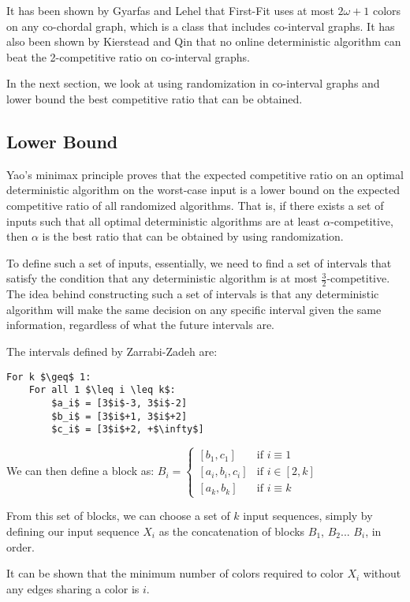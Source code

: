 It has been shown by Gyarfas and Lehel that First-Fit uses at most $2\omega+1$ colors on any co-chordal graph, which is a class that includes co-interval graphs. It has also been shown by Kierstead and Qin that no online deterministic algorithm can beat the 2-competitive ratio on co-interval graphs.

In the next section, we look at using randomization in co-interval graphs and lower bound the best competitive ratio that can be obtained.
\subsection{Lower Bound}
Yao's minimax principle proves that the expected competitive ratio on an optimal deterministic algorithm on the worst-case input is a lower bound on the expected competitive ratio of all randomized algorithms. That is, if there exists a set of inputs such that all optimal deterministic algorithms are at least $\alpha$-competitive, then $\alpha$ is the best ratio that can be obtained by using randomization.

To define such a set of inputs, essentially, we need to find a set of intervals that satisfy the condition that any deterministic algorithm is at most $\frac{3}{2}$-competitive. The idea behind constructing such a set of intervals is that any deterministic algorithm will make the same decision on any specific interval given the same information, regardless of what the future intervals are.

The intervals defined by Zarrabi-Zadeh are: 
\begin{Verbatim}[commandchars=\\\{\},codes={\catcode`$=3\catcode`_=8}]
For k $\geq$ 1:
    For all 1 $\leq i \leq k$:
        $a_i$ = [3$i$-3, 3$i$-2]
        $b_i$ = [3$i$+1, 3$i$+2]
        $c_i$ = [3$i$+2, +$\infty$]
\end{Verbatim}
We can then define a block as:
$B_i = \begin{cases} [b_1, c_1] &\mbox{if } i \equiv 1 \\
[a_i, b_i, c_i] & \mbox{if } i \in [2,k] \\
 [a_k, b_k] &\mbox{if } i \equiv k \end{cases}$ 

From this set of blocks, we can choose a set of $k$ input sequences, simply by defining our input sequence $X_i$ as the concatenation of blocks $B_1$, $B_2$... $B_i$, in order.

It can be shown that the minimum number of colors required to color $X_i$ without any edges sharing a color is $i$.

